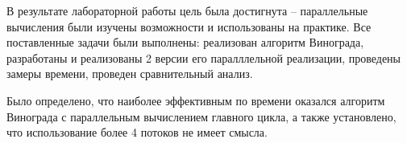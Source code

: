 \Conclusion %
В результате лабораторной работы цель была достигнута -- параллельные вычисления были изучены возможности и использованы на практике. Все поставленные задачи были выполнены: реализован алгоритм Винограда, разработаны и реализованы 2 версии его паралллельной реализации, проведены замеры времени, проведен сравнительный анализ.
\par Было определено, что наиболее эффективным по времени оказался алгоритм Винограда с параллельным вычислением главного цикла, а также установлено, что использование более 4 потоков не имеет смысла.